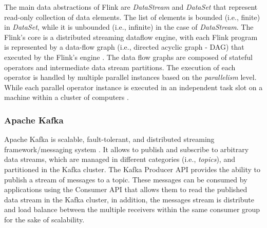 \par The main data abstractions of Flink are \textit{DataStream} and \textit{DataSet} that represent read-only collection of data elements. The list of elements is bounded (i.e., finite) in \textit{DataSet}, while it is unbounded (i.e., infinite) in the case of \textit{DataStream}. The Flink's core is a distributed streaming dataflow engine, with each
Flink program is represented by a data-flow graph (i.e., directed acyclic graph - DAG) that executed by the Flink's engine \cite{carbone2015apache}. The data flow graphs are composed of stateful operators and intermediate data stream partitions.  The execution of each operator is handled by multiple parallel instances based on the \textit{parallelism} level. While each parallel operator instance is executed in an independent task slot on a machine within a cluster of computers \cite{Flink}.    

\subsubsection*{Apache Kafka}

\par Apache Kafka is scalable, fault-tolerant, and distributed streaming framework/messaging system \cite{Kafka}. It allows to publish and subscribe to arbitrary data streams, which are managed in different categories (i.e., \textit{topics}), and  partitioned in the Kafka cluster. The Kafka Producer API provides the ability to publish a stream of messages to a topic. These messages can be consumed by applications using the Consumer API that allows them to read the published data stream in the Kafka cluster, in addition, the messages stream is distribute and load balance between the multiple receivers within the same consumer group for the sake of scalability.
  





%
